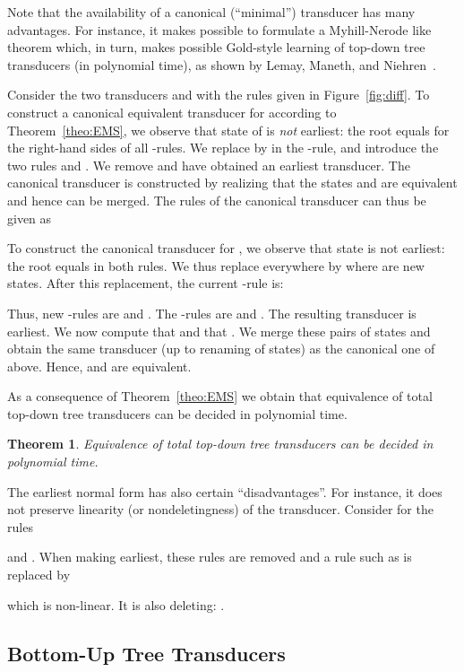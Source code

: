 \documentclass[copyright,creativecommons]{eptcs}
\newtheorem{theorem}{Theorem}
\begin{document}
Note that the availability of a canonical (``minimal'') transducer
has many advantages. For instance, it makes possible to formulate a
Myhill-Nerode like theorem which, in turn, makes possible Gold-style
learning of top-down tree transducers (in polynomial time),
as shown by Lemay, Maneth, and Niehren~\cite{DBLP:conf/pods/LemayMN10}.

Consider the two transducers  and  with the rules given
in Figure~\ref{fig:diff}. To construct a canonical equivalent transducer
for  according to Theorem~\ref{theo:EMS}, we observe that state
 of  is \emph{not} earliest: the root equals  for 
the right-hand sides of all -rules. We replace 
 by  in the -rule, and
introduce the two rules  and
. We remove  and have obtained 
an earliest transducer. The canonical transducer is constructed
by realizing that the states  and  are equivalent
and hence can be merged. The rules of the canonical transducer can
thus be given as

To construct the canonical transducer for , we observe that state 
is not earliest: the root equals  in both rules. 
We thus replace  everywhere by  where
 are new states. After this replacement, the 
current -rule is:

Thus, new -rules are
 and
.
The -rules are  and .
The resulting transducer is earliest.
We now compute that  and that .
We merge these pairs of states and obtain the same transducer
(up to renaming of states) as the canonical one of  above.
Hence,  and  are equivalent.

As a consequence of Theorem~\ref{theo:EMS}
we obtain that equivalence of total top-down
tree transducers can be decided in polynomial time. 

\begin{theorem}\rm\label{theo:complex}
Equivalence of total top-down tree transducers can be
decided in polynomial time.
\end{theorem}

The earliest normal form has also certain ``disadvantages''.
For instance, it does not preserve linearity (or nondeletingness) of the
transducer. Consider for  the rules

and .
When making earliest, these rules are removed and a rule such as 
 is replaced by

which is non-linear. It is also deleting:
.


\subsection{Bottom-Up Tree Transducers}
\end{document}

